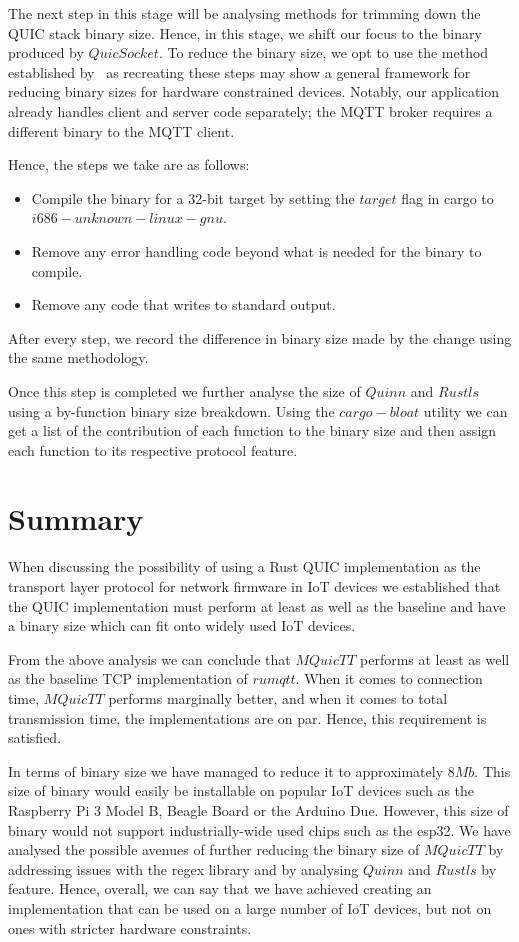 The next step in this stage will be analysing methods for trimming down the QUIC stack binary size.
Hence, in this stage, we shift our focus to the binary produced by $QuicSocket$.
To reduce the binary size, we opt to use the method established by~\citet{eggert_towards_2020} as recreating these steps may show a general framework for reducing binary sizes for hardware constrained devices.
Notably, our application already handles client and server code separately; the MQTT broker requires a different binary to the MQTT client.

Hence, the steps we take are as follows:

\begin{itemize}
    \item Compile the binary for a 32-bit target by setting the $target$ flag in cargo to $i686-unknown-linux-gnu$.
    \item Remove any error handling code beyond what is needed for the binary to compile.
    \item Remove any code that writes to standard output.
\end{itemize}

After every step, we record the difference in binary size made by the change using the same methodology.

Once this step is completed we further analyse the size of $Quinn$ and $Rustls$ using a by-function binary size breakdown.
Using the $cargo-bloat$ utility we can get a list of the contribution of each function to the binary size and then assign each function to its respective protocol feature.



\section{Summary}

When discussing the possibility of using a Rust QUIC implementation as the transport layer protocol for network firmware in IoT devices we established that the QUIC implementation must perform at least as well as the baseline and have a binary size which can fit onto widely used IoT devices.

From the above analysis we can conclude that $MQuicTT$ performs at least as well as the baseline TCP implementation of $rumqtt$.
When it comes to connection time, $MQuicTT$ performs marginally better, and when it comes to total transmission time, the implementations are on par.
Hence, this requirement is satisfied.

In terms of binary size we have managed to reduce it to approximately $8Mb$.
This size of binary would easily be installable on popular IoT devices such as the Raspberry Pi 3 Model B, Beagle Board or the Arduino Due.
However, this size of binary would not support industrially-wide used chips such as the esp32.
We have analysed the possible avenues of further reducing the binary size of $MQuicTT$ by addressing issues with the regex library and by analysing $Quinn$ and $Rustls$ by feature.
Hence, overall, we can say that we have achieved creating an implementation that can be used on a large number of IoT devices, but not on ones with stricter hardware constraints.
